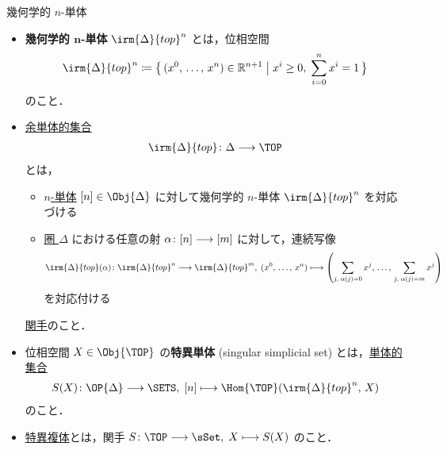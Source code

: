 \documentclass[TQFT_main]{subfiles}
\begin{document}
\begin{mydef}[label=def:simplicial-top,breakable]{幾何学的 $n$-単体}
    \begin{itemize}
        \item \textbf{幾何学的 $\bm{n}$-単体} $\irm{\Delta}{top}^n$ とは，位相空間
        \begin{align}
            \irm{\Delta}{top}^n \coloneqq \bigl\{\, (x^0,\, \dots,\, x^n) \in \mathbb{R}^{n+1}\bigm| x^i \ge 0,\; \sum_{i=0}^n x^i = 1 \,\bigr\} 
        \end{align}
        のこと．
        \item \hyperref[def:SimpSet]{余単体的集合} 
        \begin{align}
            \irm{\Delta}{top} \colon \Delta \lto \TOP
        \end{align}
        とは，
        \begin{itemize}
            \item \hyperref[def:simplex-cat]{$n$-単体} $[n] \in \Obj{\Delta}$ に対して幾何学的 $n$-単体 $\irm{\Delta}{top}^n$ を対応づける
            \item \hyperref[def:simplex-cat]{圏 $\Delta$} における任意の射 $\alpha \colon [n] \longrightarrow [m]$ に対して，連続写像
            \begin{align}
                \irm{\Delta}{top}(\alpha) \colon \irm{\Delta}{top}^n \lto \irm{\Delta}{top}^m,\; (x^0,\, \dots,\, x^n) \lmto \left( \sum_{j,\; \alpha(j) = 0} x^j,\, \dots ,\, \sum_{j,\; \alpha(j) = m} x^j \right) 
            \end{align}
            を対応付ける
        \end{itemize}
        \hyperref[def:functor]{関手}のこと．
        \item 位相空間 $X \in \Obj{\TOP}$ の\textbf{特異単体} (singular simplicial set) とは，\hyperref[def:SimpSet]{単体的集合}
        \begin{align}
            S(X) \colon \OP{\Delta} \lto \SETS,\; [n] \lmto \Hom{\TOP} (\irm{\Delta}{top}^n ,\, X)
        \end{align}
        のこと．
        \item \hyperref[def:simplicial-top]{特異複体}とは，関手 $S \colon \TOP \lto \sSet,\; X \lmto S(X)$ のこと．
    \end{itemize}
    
\end{mydef}
\end{document}
